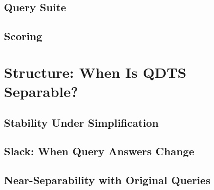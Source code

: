 \documentclass[conference]{IEEEtran}
\begin{document}
\subsection{Query Suite}
\label{sec:queries}

\subsection{Scoring}
\label{sec:scoring}


\section{Structure: When Is QDTS Separable?}
\label{sec:structure}

\subsection{Stability Under Simplification}
\label{sec:stability}

\subsection{Slack: When Query Answers Change}
\label{sec:slack}

\subsection{Near-Separability with Original Queries}
\label{sec:separability}
\end{document}
